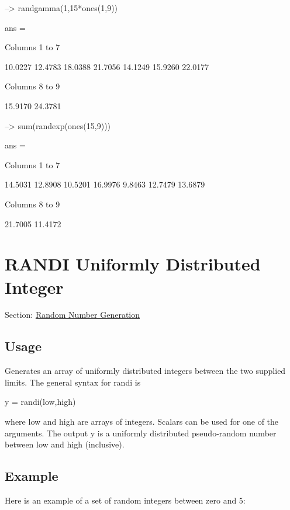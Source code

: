 \begin{DoxyVerbInclude}
--> randgamma(1,15*ones(1,9))

ans = 

 Columns 1 to 7

   10.0227   12.4783   18.0388   21.7056   14.1249   15.9260   22.0177 

 Columns 8 to 9

   15.9170   24.3781 

--> sum(randexp(ones(15,9)))

ans = 

 Columns 1 to 7

   14.5031   12.8908   10.5201   16.9976    9.8463   12.7479   13.6879 

 Columns 8 to 9

   21.7005   11.4172 
\end{DoxyVerbInclude}
 \hypertarget{random_randi}{}\section{R\-A\-N\-D\-I Uniformly Distributed Integer}\label{random_randi}
Section\-: \hyperlink{sec_random}{Random Number Generation} \hypertarget{vtkwidgets_vtkxyplotwidget_Usage}{}\subsection{Usage}\label{vtkwidgets_vtkxyplotwidget_Usage}
Generates an array of uniformly distributed integers between the two supplied limits. The general syntax for {\ttfamily randi} is \begin{DoxyVerb}   y = randi(low,high)
\end{DoxyVerb}
 where {\ttfamily low} and {\ttfamily high} are arrays of integers. Scalars can be used for one of the arguments. The output {\ttfamily y} is a uniformly distributed pseudo-\/random number between {\ttfamily low} and {\ttfamily high} (inclusive). \hypertarget{variables_struct_Example}{}\subsection{Example}\label{variables_struct_Example}
Here is an example of a set of random integers between zero and 5\-:


